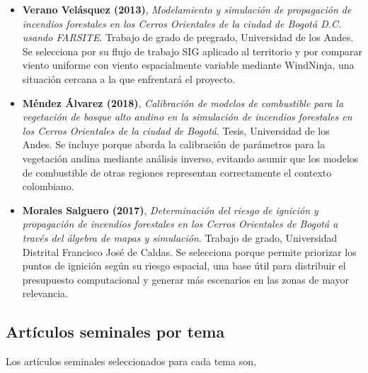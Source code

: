 \begin{itemize}
    \item \textbf{Verano Velásquez (2013)}, \textit{Modelamiento y simulación de propagación de incendios forestales en los Cerros Orientales de la ciudad de Bogotá D.C. usando FARSITE}. Trabajo de grado de pregrado, Universidad de los Andes. Se selecciona por su flujo de trabajo SIG aplicado al territorio y por comparar viento uniforme con viento espacialmente variable mediante WindNinja, una situación cercana a la que enfrentará el proyecto.
    \item \textbf{Méndez Álvarez (2018)}, \textit{Calibración de modelos de combustible para la vegetación de bosque alto andino en la simulación de incendios forestales en los Cerros Orientales de la ciudad de Bogotá}. Tesis, Universidad de los Andes. Se incluye porque aborda la calibración de parámetros para la vegetación andina mediante análisis inverso, evitando asumir que los modelos de combustible de otras regiones representan correctamente el contexto colombiano.
    \item \textbf{Morales Salguero (2017)}, \textit{Determinación del riesgo de ignición y propagación de incendios forestales en los Cerros Orientales de Bogotá a través del álgebra de mapas y simulación}. Trabajo de grado, Universidad Distrital Francisco José de Caldas. Se selecciona porque permite priorizar los puntos de ignición según su riesgo espacial, una base útil para distribuir el presupuesto computacional y generar más escenarios en las zonas de mayor relevancia.
\end{itemize}


\subsection{Artículos seminales por tema}

Los artículos seminales seleccionados para cada tema son,

